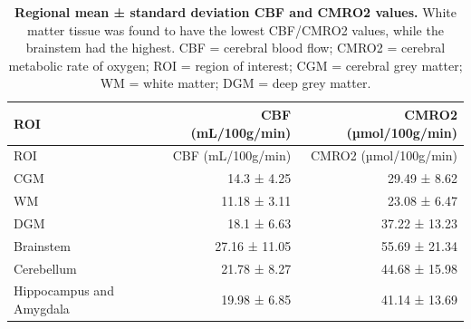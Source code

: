 \documentclass[
  letterpaper,
  DIV=11,
  numbers=noendperiod]{scrartcl}
\begin{document}
\begin{longtable}[]{@{}lrr@{}}
\caption{\textbf{Regional mean ± standard deviation CBF and CMRO2
values.} White matter tissue was found to have the lowest CBF/CMRO2
values, while the brainstem had the highest. CBF = cerebral blood flow;
CMRO2 = cerebral metabolic rate of oxygen; ROI = region of interest; CGM
= cerebral grey matter; WM = white matter; DGM = deep grey
matter.}\label{tbl-regvalues}\tabularnewline
\toprule\noalign{}
ROI & CBF (mL/100g/min) & CMRO2 (µmol/100g/min) \\
\midrule\noalign{}
\endfirsthead
\toprule\noalign{}
ROI & CBF (mL/100g/min) & CMRO2 (µmol/100g/min) \\
\midrule\noalign{}
\endhead
\bottomrule\noalign{}
\endlastfoot
CGM & 14.3 ± 4.25 & 29.49 ± 8.62 \\
WM & 11.18 ± 3.11 & 23.08 ± 6.47 \\
DGM & 18.1 ± 6.63 & 37.22 ± 13.23 \\
Brainstem & 27.16 ± 11.05 & 55.69 ± 21.34 \\
Cerebellum & 21.78 ± 8.27 & 44.68 ± 15.98 \\
Hippocampus and Amygdala & 19.98 ± 6.85 & 41.14 ± 13.69 \\
\end{longtable}

\newpage{}
\end{document}
